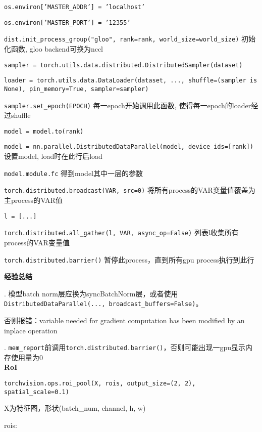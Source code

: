 \documentclass[UTF8]{ctexart}
\begin{document}
  \quad \quad \texttt{os.environ['MASTER\_ADDR'] = 'localhost'}
  
  \quad \quad \texttt{os.environ['MASTER\_PORT'] = '12355'} 

  \quad \quad \texttt{dist.init\_process\_group("gloo", rank=rank, world\_size=world\_size)} 初始化函数, gloo backend可换为nccl

  \quad \quad \texttt{sampler = torch.utils.data.distributed.DistributedSampler(dataset)}

  \quad \quad \texttt{loader = torch.utils.data.DataLoader(dataset, ..., shuffle=(sampler is None), pin\_memory=True, sampler=sampler)}

  \quad \quad \texttt{sampler.set\_epoch(EPOCH)} 每一epoch开始调用此函数, 使得每一epoch的loader经过shuffle
  
  \quad \quad \texttt{model = model.to(rank)}

  \quad \quad \texttt{model = nn.parallel.DistributedDataParallel(model, device\_ids=[rank])} 设置model, load时在此行后load

  \quad \quad \texttt{model.module.fc} 得到model其中一层的参数

  \quad \quad \texttt{torch.distributed.broadcast(VAR, src=0)} 将所有process的VAR变量值覆盖为主process的VAR值

  \quad \quad \texttt{l = [...]}

  \quad \quad \texttt{torch.distributed.all\_gather(l, VAR, async\_op=False)} 列表l收集所有process的VAR变量值
  
  \quad \quad \texttt{torch.distributed.barrier()} 暂停此process，直到所有gpu process执行到此行

  \quad \quad \textbf{经验总结}
  
  \quad \quad {}. 模型batch norm层应换为syncBatchNorm层，或者使用\texttt{DistributedDataParallel(..., broadcast\_buffers=False)}。
  
  \quad \quad \quad \quad 否则报错：variable needed for gradient computation has been modified by an inplace operation 
  
  \quad \quad {}. \texttt{mem\_report}前调用\texttt{torch.distributed.barrier()}，否则可能出现一gpu显示内存使用量为0\\
\textbf{RoI}

  \texttt{torchvision.ops.roi\_pool(X, rois, output\_size=(2, 2), spatial\_scale=0.1)}

  \quad X为特征图，形状(batch\_num, channel, h, w)

  \quad rois:
\end{document}
